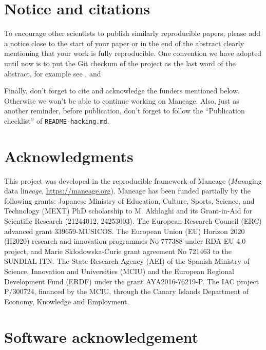 \documentclass[10pt, twocolumn]{article}
\begin{document}
\section{Notice and citations}
To encourage other scientists to publish similarly reproducible papers,
please add a notice close to the start of your paper or in the end of the
abstract clearly mentioning that your work is fully reproducible. One
convention we have adopted until now is to put the Git checkum of the
project as the last word of the abstract, for example see
\citet{akhlaghi19}, \citet{infantesainz20} and \citet{akhlaghi20}

Finally, don't forget to cite \citet{akhlaghi20} and acknowledge the
funders mentioned below. Otherwise we won't be able to continue working on
Maneage. Also, just as another reminder, before publication, don't forget
to follow the ``Publication checklist'' of \texttt{README-hacking.md}.





\section{Acknowledgments}

This project was developed in the reproducible framework of Maneage
(\emph{Man}aging data lin\emph{eage}, \url{https://maneage.org}). Maneage
has been funded partially by the following grants: Japanese Ministry of
Education, Culture, Sports, Science, and Technology (MEXT) PhD scholarship
to M. Akhlaghi and its Grant-in-Aid for Scientific Research (21244012,
24253003). The European Research Council (ERC) advanced grant
339659-MUSICOS. The European Union (EU) Horizon 2020 (H2020) research and
innovation programmes No 777388 under RDA EU 4.0 project, and Marie
Sk\l{}odowska-Curie grant agreement No 721463 to the SUNDIAL ITN. The State
Research Agency (AEI) of the Spanish Ministry of Science, Innovation and
Universities (MCIU) and the European Regional Development Fund (ERDF) under
the grant AYA2016-76219-P. The IAC project P/300724, financed by the MCIU,
through the Canary Islands Department of Economy, Knowledge and Employment.

\printbibliography

\appendix

\section{Software acknowledgement}


\end{document}
